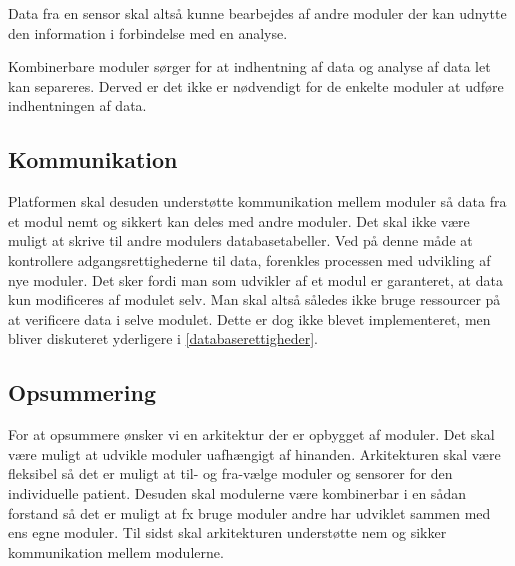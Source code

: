 Data fra en sensor skal altså kunne bearbejdes af andre moduler der kan udnytte den information i forbindelse med en analyse.

Kombinerbare moduler sørger for at indhentning af data og analyse af data let kan separeres.
Derved er det ikke er nødvendigt for de enkelte moduler at udføre indhentningen af data.

\subsection{Kommunikation}\label{arkitekturkrav::kommunikation}
Platformen skal desuden understøtte kommunikation mellem moduler så data fra et modul nemt og sikkert kan deles med andre moduler.
Det skal ikke være muligt at skrive til andre modulers databasetabeller.
Ved på denne måde at kontrollere adgangsrettighederne til data, forenkles processen med udvikling af nye moduler.
Det sker fordi man som udvikler af et modul er garanteret, at data kun modificeres af modulet selv.
Man skal altså således ikke bruge ressourcer på at verificere data i selve modulet.
Dette er dog ikke blevet implementeret, men bliver diskuteret yderligere i \cref{databaserettigheder}.


\subsection{Opsummering}
For at opsummere ønsker vi en arkitektur der er opbygget af moduler.
Det skal være muligt at udvikle moduler uafhængigt af hinanden.
Arkitekturen skal være fleksibel så det er muligt at til- og fra-vælge moduler og sensorer for den individuelle patient.
Desuden skal modulerne være kombinerbar i en sådan forstand så det er muligt at fx bruge moduler andre har udviklet sammen med ens egne moduler.
Til sidst skal arkitekturen understøtte nem og sikker kommunikation mellem modulerne.


